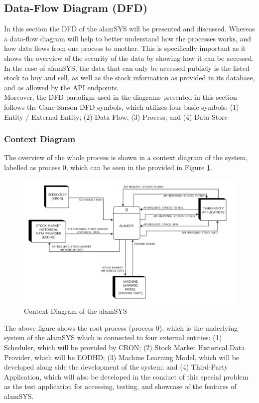 \subsection{Data-Flow Diagram (DFD)}
\label{subsec:dfd}
In this section the DFD of the alamSYS will be presented and discussed. 
Whereas a data-flow diagram will help to better understand how the processes works, 
and how data flows from one process to another. This is specifically important 
as it shows the overview of the security of the data by showing how it can be 
accessed. In the case of alamSYS, the data that can only be accessed publicly is 
the listed stock to buy and sell, as well as the stock information as provided 
in its database, and as allowed by the API endpoints.
\hfill \\

Moreover, the DFD paradigm used in the diagrams presented in this 
section follows the Gane-Sarson DFD symbols, which utilizes four basic symbols: 
(1) Entity / External Entity; 
(2) Data Flow; 
(3) Process; and 
(4) Data Store 
\cite{VisualParadigm}
\subsubsection{Context Diagram}
\label{subsubsec:context_dfd}
The overview of the whole process is shown in a context diagram of the system,
labelled as process 0, which can be seen in the provided in Figure 
\ref{fig:context_dfd}.
\begin{figure}[ht]
    \centering
    \includegraphics[width=1\textwidth]{./assets/Data Flow Diagram-01.png}
    \caption{Context Diagram of the alamSYS}
    \label{fig:context_dfd}
\end{figure}
\FloatBarrier
\vspace{0.5cm}
The above figure shows the root process (process 0), which is the underlying 
system of the alamSYS which is connected to four external entities: (1) Scheduler, 
which will be provided by CRON; (2) Stock Market Historical Data Provider, 
which will be EODHD; (3) Machine Learning Model, which will be developed 
along side the development of the system; and (4) Third-Party Application, 
which will also be developed in the conduct of this special problem as the 
test application for accessing, testing, and showcase of the features of alamSYS.
\hfill \\

